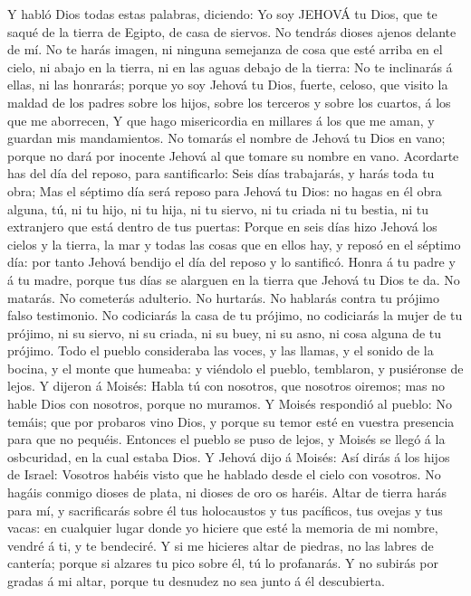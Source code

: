  Y habló Dios todas estas palabras, diciendo: 
Yo soy JEHOVÁ tu Dios, que te saqué de la tierra de Egipto, de casa de
siervos.  No tendrás dioses ajenos delante de mí.
 No te harás imagen, ni ninguna semejanza de cosa que esté
arriba en el cielo, ni abajo en la tierra, ni en las aguas debajo de la
tierra:  No te inclinarás á ellas, ni las honrarás; porque
yo soy Jehová tu Dios, fuerte, celoso, que visito la maldad de los
padres sobre los hijos, sobre los terceros y sobre los cuartos, á los
que me aborrecen,  Y que hago misericordia en millares á los
que me aman, y guardan mis mandamientos.  No tomarás el
nombre de Jehová tu Dios en vano; porque no dará por inocente Jehová al
que tomare su nombre en vano.  Acordarte has del día del
reposo, para santificarlo:  Seis días trabajarás, y harás
toda tu obra;  Mas el séptimo día será reposo para Jehová
tu Dios: no hagas en él obra alguna, tú, ni tu hijo, ni tu hija, ni tu
siervo, ni tu criada ni tu bestia, ni tu extranjero que está dentro de
tus puertas:  Porque en seis días hizo Jehová los cielos y
la tierra, la mar y todas las cosas que en ellos hay, y reposó en el
séptimo día: por tanto Jehová bendijo el día del reposo y lo santificó.
 Honra á tu padre y á tu madre, porque tus días se alarguen
en la tierra que Jehová tu Dios te da.  No matarás.
 No cometerás adulterio.  No hurtarás.
 No hablarás contra tu prójimo falso testimonio.
 No codiciarás la casa de tu prójimo, no codiciarás la
mujer de tu prójimo, ni su siervo, ni su criada, ni su buey, ni su asno,
ni cosa alguna de tu prójimo.  Todo el pueblo consideraba
las voces, y las llamas, y el sonido de la bocina, y el monte que
humeaba: y viéndolo el pueblo, temblaron, y pusiéronse de lejos.
 Y dijeron á Moisés: Habla tú con nosotros, que nosotros
oiremos; mas no hable Dios con nosotros, porque no muramos.
 Y Moisés respondió al pueblo: No temáis; que por probaros
vino Dios, y porque su temor esté en vuestra presencia para que no
pequéis.  Entonces el pueblo se puso de lejos, y Moisés se
llegó á la osbcuridad, en la cual estaba Dios.  Y Jehová
dijo á Moisés: Así dirás á los hijos de Israel: Vosotros habéis visto
que he hablado desde el cielo con vosotros.  No hagáis
conmigo dioses de plata, ni dioses de oro os haréis.  Altar
de tierra harás para mí, y sacrificarás sobre él tus holocaustos y tus
pacíficos, tus ovejas y tus vacas: en cualquier lugar donde yo hiciere
que esté la memoria de mi nombre, vendré á ti, y te bendeciré.
 Y si me hicieres altar de piedras, no las labres de
cantería; porque si alzares tu pico sobre él, tú lo profanarás.
 Y no subirás por gradas á mi altar, porque tu desnudez no
sea junto á él descubierta.

